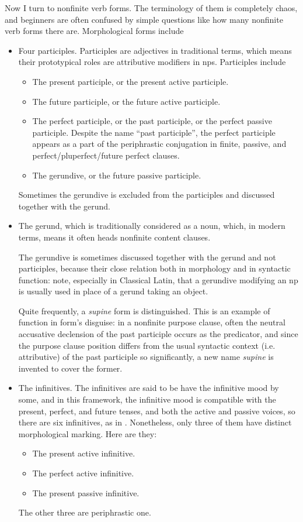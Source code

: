 \documentclass{article}
\newcommand*{\term}[1]{\emph{#1}}
\begin{document}
Now I turn to nonfinite verb forms.
The terminology of them is completely chaos, 
and beginners are often confused by simple questions like how many nonfinite verb forms there are.
Morphological forms include 
\begin{itemize}
    \item Four participles. Participles are adjectives in traditional terms,
    which means their prototypical roles are attributive modifiers in \ac{np}s.
    Participles include 
    \begin{itemize}
        \item The present participle, or the present active participle.
        \item The future participle, or the future active participle.
        \item The perfect participle, or the past participle, or the perfect passive participle.
        Despite the name ``past participle'', the perfect participle appears 
        as a part of the periphrastic conjugation
        in finite, passive, and perfect/pluperfect/future perfect clauses.
        \item The gerundive, or the future passive participle.
    \end{itemize}
    Sometimes the gerundive is excluded from the participles and discussed together with the gerund.
    \item The gerund, which is traditionally considered as a noun,
    which, in modern terms, means it often heads nonfinite content clauses.

    The gerundive is sometimes discussed together with the gerund and not participles,
    because their close relation both in morphology and in syntactic function:
    note, especially in Classical Latin, that 
    a gerundive modifying an \ac{np} is usually used in place of 
    a gerund taking an object.

    Quite frequently, a \term{supine} form is distinguished.
    This is an example of function in form's disguise: 
    in a nonfinite purpose clause,
    often the neutral accusative declension of the past participle occurs as the predicator,
    and since the purpose clause position differs 
    from the usual syntactic context (i.e. attributive) of the past participle
    so significantly,
    a new name \term{supine} is invented to cover the former.
    \item The infinitives. The infinitives are said to be have the infinitive mood by some,
    and in this framework, the infinitive mood is compatible with the 
    present, perfect, and future tenses,
    and both the active and passive voices,
    so there are six infinitives, as in .
    Nonetheless, only three of them have distinct morphological marking. 
    Here are they:
    \begin{itemize}
        \item The present active infinitive.
        \item The perfect active infinitive.
        \item The present passive infinitive.
    \end{itemize}
    The other three are periphrastic one.


\end{itemize}
\end{document}

